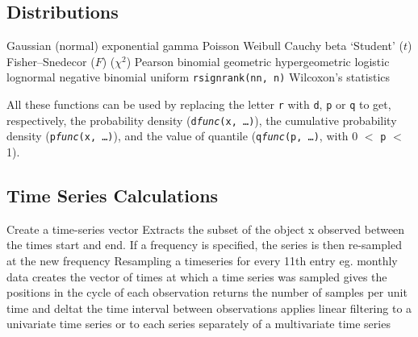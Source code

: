 \subsection{Distributions}{}
	{Gaussian (normal)}
	{exponential}
	{gamma}
	{Poisson}
	{Weibull}
	{Cauchy}
	{beta}
	{`Student' ($t$)}
	{Fisher--Snedecor ($F$)  ($\chi^2$)}
	{Pearson}
	{binomial}
	{geometric}
	{hypergeometric}
	{logistic}
	{lognormal}
	{negative binomial}
	{uniform}
	{{\tt rsignrank(nn, n)} Wilcoxon's statistics}

All these functions can be used by replacing the letter {\tt r} with
{\tt d}, {\tt p} or {\tt q} to get, respectively, the probability
density ({\tt d{\it func}(x, \ldots)}), the cumulative probability
density ({\tt p{\it func}(x, \ldots)}), and the value of quantile
({\tt q{\it func}(p, \ldots)}, with 0 $<$ {\tt p} $<$ 1).

\subsection{Time Series Calculations}{}
	{Create a time-series vector}
	{Extracts the subset of the object x observed between the
    times start and end. If a frequency is specified, the series is then re-sampled
    at the new frequency}
	{Resampling a timeseries for
    every 11th entry eg. monthly data}
	{creates the vector of times at which a time series was sampled}
	{gives the positions in the cycle of each observation}
	{returns the number of samples per unit time and deltat the
    time interval between observations}
	{applies linear filtering to a univariate time series
    or to each series separately of a multivariate time series}

